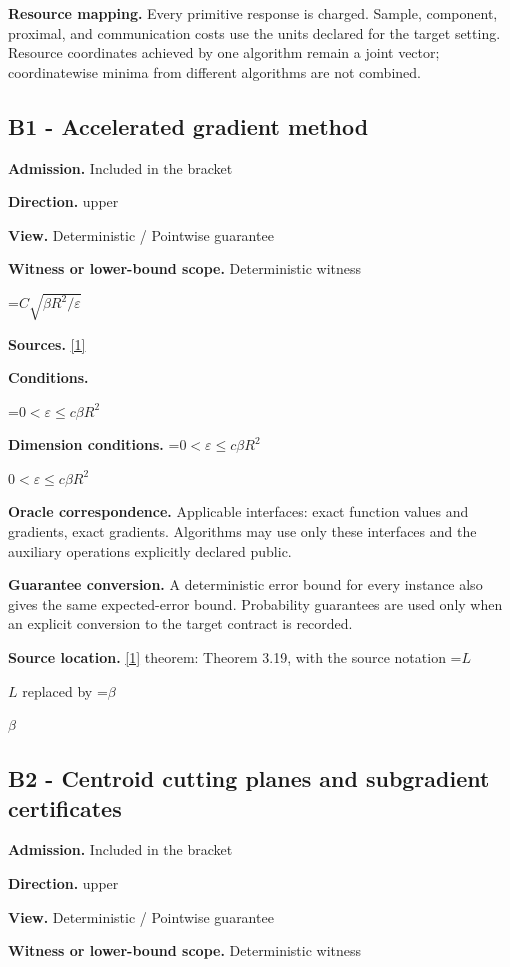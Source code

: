 \documentclass[10pt,a4paper]{article}
\newcommand{\AtlasMath}[1]{\par\begingroup\centering\setbox0=\hbox{$\displaystyle #1$}\ifdim\wd0>1.4\linewidth\typeout{ATLAS WIDE FORMULA: \the\wd0}\fi\ifdim\wd0>\linewidth\resizebox{\linewidth}{!}{\box0}\else\box0\fi\par\endgroup}
\newcommand{\AtlasInlineMath}[1]{\begingroup\setbox0=\hbox{$#1$}\ifdim\wd0>.4\linewidth\endgroup\AtlasMath{#1}\else\endgroup$#1$\fi}
\begin{document}
\textbf{Resource mapping.} Every primitive response is charged. Sample, component, proximal, and communication costs use the units declared for the target setting. Resource coordinates achieved by one algorithm remain a joint vector; coordinatewise minima from different algorithms are not combined.

\subsection{B1 - Accelerated gradient method}
\textbf{Admission.} Included in the bracket

\textbf{Direction.} upper

\textbf{View.} Deterministic / Pointwise guarantee

\textbf{Witness or lower-bound scope.} Deterministic witness

\AtlasMath{C\sqrt{\beta R^2/\varepsilon}}
\textbf{Sources.} \href{https://arxiv.org/pdf/1405.4980}{[1]}

\textbf{Conditions.} 
\AtlasMath{0<\varepsilon\le c\beta R^2}


\textbf{Dimension conditions.} \AtlasInlineMath{0<\varepsilon\le c\beta R^2}

\textbf{Oracle correspondence.} Applicable interfaces: exact function values and gradients, exact gradients. Algorithms may use only these interfaces and the auxiliary operations explicitly declared public.

\textbf{Guarantee conversion.} A deterministic error bound for every instance also gives the same expected-error bound. Probability guarantees are used only when an explicit conversion to the target contract is recorded.

\textbf{Source location.} \href{https://arxiv.org/pdf/1405.4980}{[1]} theorem: Theorem 3.19, with the source notation \AtlasInlineMath{L} replaced by \AtlasInlineMath{\beta}

\subsection{B2 - Centroid cutting planes and subgradient certificates}
\textbf{Admission.} Included in the bracket

\textbf{Direction.} upper

\textbf{View.} Deterministic / Pointwise guarantee

\textbf{Witness or lower-bound scope.} Deterministic witness
\end{document}
